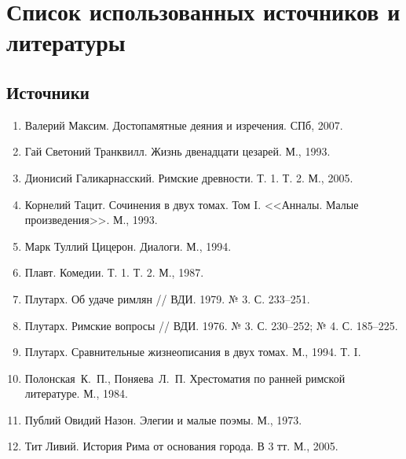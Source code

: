 \chapter*{Список использованных источников и литературы}

\begin{flushleft}

\section*{Источники}

\begin{enumerate}


\item Валерий Максим. Достопамятные деяния и изречения. СПб, 2007.

\item Гай Светоний Транквилл. Жизнь двенадцати цезарей. М., 1993.

\item Дионисий Галикарнасский. Римские древности. Т. 1. Т. 2. М., 2005.

\item Корнелий Тацит. Сочинения в двух томах. Том I. <<Анналы. Малые произведения>>. М., 1993.

\item Марк Туллий Цицерон. Диалоги. М., 1994.

\item Плавт. Комедии. Т. 1. Т. 2. М., 1987.

\item Плутарх. Об удаче римлян // ВДИ. 1979. № 3. С. 233--251.

\item Плутарх. Римские вопросы // ВДИ. 1976. № 3. С. 230--252; № 4. С. 185--225.

\item Плутарх. Сравнительные жизнеописания в двух томах. М., 1994. Т. I.

\item Полонская~К.~П., Поняева~Л.~П. Хрестоматия по ранней римской литературе. М., 1984.

\item Публий Овидий Назон. Элегии и малые поэмы. М., 1973.

\item Тит Ливий. История Рима от основания города. В 3 тт. М., 2005.


\end{enumerate}
\end{flushleft}
